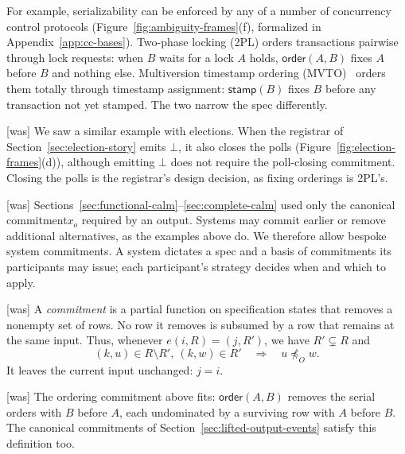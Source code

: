 \documentclass[sigconf]{cidr-2027}
\theoremstyle{remark}
\newcommand{\OutputOrd}{\preceq_O}
\newcommand{\commitment}{commitment\xspace}
\newcommand{\commitments}{commitments\xspace}
\begin{document}
For example, serializability can be enforced by any of a number of concurrency
control protocols (Figure~\ref{fig:ambiguity-frames}(f), formalized in
Appendix~\ref{app:cc-bases}).  Two-phase locking (2PL) orders transactions
pairwise through lock requests: when $B$ waits for a lock $A$ holds,
$\mathsf{order}(A,B)$ fixes $A$ before $B$ and nothing else.  Multiversion
timestamp ordering (MVTO)~\cite{bernstein1981concurrency} orders them totally
through timestamp assignment: $\mathsf{stamp}(B)$ fixes $B$ before any
transaction not yet stamped.  The
two narrow the spec differently.



{\footnotesize\color{black!50}\noindent\textsf{[was]} We saw a similar example with elections.  When the registrar of
Section~\ref{sec:election-story} emits $\bot$, it also closes the polls
(Figure~\ref{fig:election-frames}(d)), although emitting $\bot$ does not
require the poll-closing \commitment.  Closing the polls is the registrar's
design decision, as fixing orderings is 2PL's.\par}



{\footnotesize\color{black!50}\noindent\textsf{[was]} Sections~\ref{sec:functional-calm}--\ref{sec:complete-calm} used only the
canonical \commitment $x_o$ required by an output.  Systems may commit earlier
or remove additional alternatives, as the examples above do.  We therefore
allow bespoke system \commitments.  A system dictates a spec and a basis of
\commitments its participants may issue; each participant's strategy decides
when and which to apply.\par}



{\footnotesize\color{black!50}\noindent\textsf{[was]} A \emph{\commitment} is a partial function on
specification states that removes a nonempty set of rows.  No row it removes
is subsumed by a row that remains at the same input.  Thus, whenever $e(i,R)=(j,R')$, we have $R'\subsetneq R$ and
\begin{equation}
  (k,u)\in R\setminus R',\ (k,w)\in R'
  \quad\Longrightarrow\quad
  u\not\OutputOrd w.
\end{equation}
It leaves the current input unchanged: $j=i$.\par}



{\footnotesize\color{black!50}\noindent\textsf{[was]} The ordering \commitment above fits: $\mathsf{order}(A,B)$ removes the serial
orders with $B$ before $A$, each undominated by a surviving row with $A$
before $B$.  The canonical \commitments of Section~\ref{sec:lifted-output-events} satisfy this definition too.\par}
\end{document}
